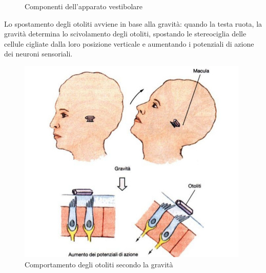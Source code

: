 \documentclass[a4paper,12pt]{article}
\begin{document}
\begin{figure}[H]
 \centering
  \quad
{}
    \caption{Componenti dell'apparato vestibolare}
\end{figure}

Lo spostamento degli otoliti avviene in base alla gravità: quando la testa ruota, la gravità determina lo scivolamento degli otoliti, spostando le stereociglia delle cellule cigliate dalla loro posizione verticale e aumentando i potenziali di azione dei neuroni sensoriali.

\begin{figure}[H]
\centering
\includegraphics[scale=0.45]{immagine/otoliti1.jpg}
\caption{Comportamento degli otoliti secondo la gravità}
\end{figure} 
\end{document}

